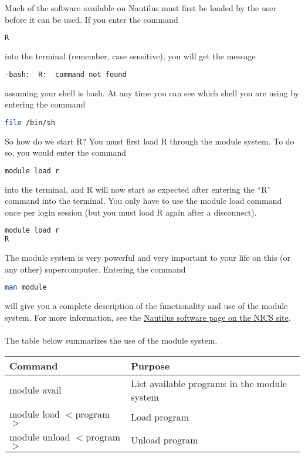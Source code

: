 Much of the software available on Nautilus must first be loaded by the user before it can be used.  If you enter the command
\begin{lstlisting}[language=sh]
R
\end{lstlisting}%
into the terminal (remember, case sensitive), you will get the message
\begin{lstlisting}[language=sh]
-bash:  R:  command not found
\end{lstlisting}%
assuming your shell is bash.  At any time you can see which shell you are using by entering the command
\begin{lstlisting}[language=sh]
file /bin/sh
\end{lstlisting}%
So how do we start R?  You must first load R through the module system.  To do so, you would enter the command
\begin{lstlisting}[language=sh]
module load r
\end{lstlisting}%
into the terminal, and R will now start as expected after entering the ``R'' command into the terminal.  You only have to use the module load command once per login session (but you must load R again after a disconnect).  
\begin{lstlisting}[language=sh]
module load r
R
\end{lstlisting}%
The module system is very powerful and very important to your life on this (or any other) supercomputer.  Entering the command
\begin{lstlisting}[language=sh]
man module
\end{lstlisting}%
will give you a complete description of the functionality and use of the module system.  For more information, see the \href{http://www.nics.tennessee.edu/computing-resources/nautilus/software}{Nautilus software page on the NICS site}.\\\\
%
The table below summarizes the use of the module system.

\begin{table}[h]
 \centering
\begin{tabular}{ll}\hline
Command & Purpose\\\hline
module avail & List available programs in the module system\\
module load $<$program$>$ & Load program\\
module unload $<$program$>$ & Unload program\\\hline
\end{tabular}
\end{table}

